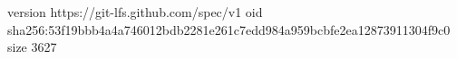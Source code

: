 version https://git-lfs.github.com/spec/v1
oid sha256:53f19bbb4a4a746012bdb2281e261c7edd984a959bcbfe2ea12873911304f9c0
size 3627

